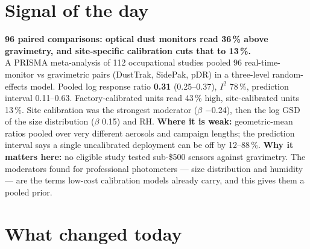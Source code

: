 \documentclass[10pt]{article}
\begin{document}
\vspace{6mm}

\section*{\sffamily\bfseries\color{Deep}Signal of the day}
\vspace{-1.5mm}{\color{Amber}\rule{\linewidth}{1.1pt}}\vspace{2.5mm}

\begin{keybox}
{\sffamily\bfseries\small\color{Deep}96 paired comparisons: optical dust monitors read 36\,\% above
gravimetry, and site-specific calibration cuts that to 13\,\%.}\\[1.4mm]
\footnotesize
A PRISMA meta-analysis of 112 occupational studies pooled 96 real-time-monitor vs gravimetric pairs (DustTrak, SidePak,
pDR) in a three-level random-effects model. Pooled log response ratio \textbf{0.31} (0.25--0.37), $I^2$ 78\,\%, prediction
interval 0.11--0.63. Factory-calibrated units read 43\,\% high, site-calibrated units 13\,\%. Site calibration was the
strongest moderator ($\beta$ $-$0.24), then the log GSD of the size distribution ($\beta$ 0.15) and RH.
\textbf{Where it is weak:} geometric-mean ratios pooled over very different aerosols and campaign lengths; the
prediction interval says a single uncalibrated deployment can be off by 12--88\,\%.
\textbf{Why it matters here:} no eligible study tested sub-\$500 sensors against gravimetry. The moderators found for
professional photometers --- size distribution and humidity --- are the terms low-cost calibration models already
carry, and this gives them a pooled prior.\par
\end{keybox}

\vspace{3mm}

\section*{\sffamily\bfseries\color{Deep}What changed today}
\vspace{-1.5mm}{\color{Amber}\rule{\linewidth}{1.1pt}}\vspace{2.5mm}
\end{document}
